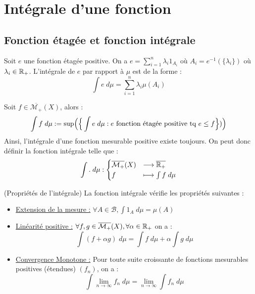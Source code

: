 \minitoc  %


\section{Intégrale d'une fonction}

\subsection{Fonction étagée et fonction intégrale}

\begin{definition}
    Soit $e$ une fonction étagée positive. On a $e = \sum_{i=1}^{n} \lambda_i 1_{A_i}$ où $A_i = e^{-1}(\{\lambda_i\})$ où $\lambda_i \in \mathbb{R}_+$.
    L'intégrale de $e$ par rapport à $\mu$ est de la forme :
        \[ \boxed{ \int e \; d \mu = \sum_{i=1}^{n} \lambda_i \mu (A_i) } \] 
\end{definition}

\begin{definition}
    Soit $f \in \overline{\mathcal{M}_+}(X)$, alors : 
        \[ \int f \; d \mu := \sup \Bigl( \Bigr\{ \int e \; d \mu : e \text{ fonction étagée positive tq } e \leq f \Bigl\}) \Bigr) \] 
    Ainsi, l'intégrale d'une fonction mesurable positive existe toujours.
    On peut donc définir la fonction intégrale telle que :
        \[ \int . \; d \mu : 
            \begin{cases}
                \overline{\mathcal{M}_+}(X) & \longrightarrow \overline{\mathbb{R}_+} \\ 
                f & \longmapsto \int f \; d \mu 
            \end{cases}
        \] 
\end{definition}

\begin{prop}(Propriétés de l'intégrale)
    La fonction intégrale vérifie les propriétés suivantes :
    \begin{itemize}
        \item \underline{Extension de la mesure :} $\forall A \in \mathcal{B}, \int 1 _A \; d \mu = \mu(A)$ 
        \item \underline{Linéarité positive :} $\forall f, g \in \overline{\mathcal{M}_+}(X), \forall \alpha \in \mathbb{R}_+$ on a :
            \[ \int (f + \alpha g) \; d \mu = \int f \; d \mu + \alpha \int g \; d \mu \]
        \item \underline{Convergence Monotone :} Pour toute suite croissante de fonctions mesurables positives (étendues) $(f_n)$, on a :
            \[ \boxed { \int \lim_{n\to\infty} f_n \; d \mu = \lim_{n\to\infty} \int f_n \; d \mu }\] 
    \end{itemize}
\end{prop}

